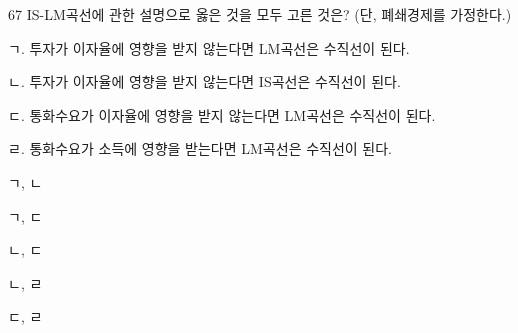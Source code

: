 \begin{question}{67}
IS-LM곡선에 관한 설명으로 옳은 것을 모두 고른 것은? (단, 폐쇄경제를 가정한다.)
\begin{framedtext}
ㄱ. 투자가 이자율에 영향을 받지 않는다면 LM곡선은 수직선이 된다. \par
ㄴ. 투자가 이자율에 영향을 받지 않는다면 IS곡선은 수직선이 된다. \par
ㄷ. 통화수요가 이자율에 영향을 받지 않는다면 LM곡선은 수직선이 된다. \par
ㄹ. 통화수요가 소득에 영향을 받는다면 LM곡선은 수직선이 된다. \par
\end{framedtext}
\begin{choices}
  \item ㄱ, ㄴ
  \item ㄱ, ㄷ
  \item ㄴ, ㄷ
  \item ㄴ, ㄹ
  \item ㄷ, ㄹ
\end{choices}
\end{question}
